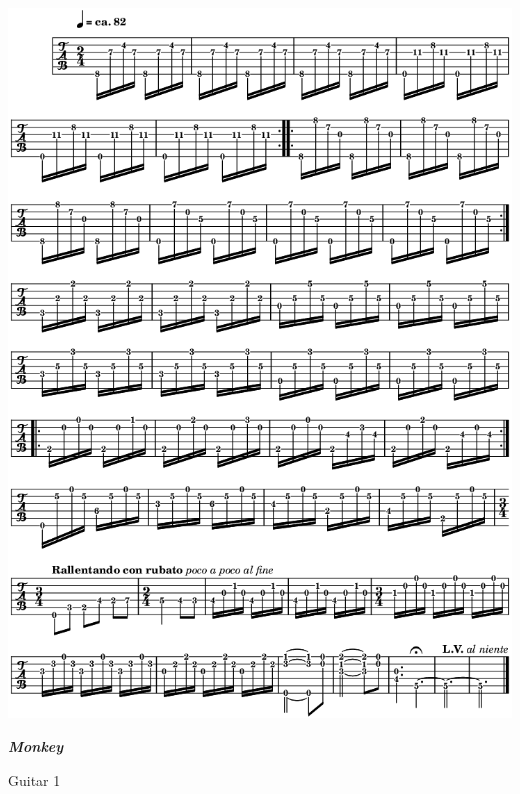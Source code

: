 \begin{center}
\includegraphics[width=\textwidth]{img/neC1}
\end{center}

\newpage

\textbf{\textsl{Monkey}}  

\smallskip

 \quad Guitar 1

